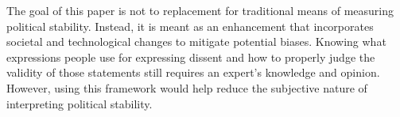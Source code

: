 \documentclass[12pt]{article}
\begin{document}
\begin{spacing}{1.5}
The goal of this paper is not to replacement for traditional means of measuring political stability. Instead, it is meant as an enhancement that incorporates societal and technological changes to mitigate potential biases. Knowing what expressions people use for expressing dissent and how to properly judge the validity of those statements still requires an expert's knowledge and opinion. However, using this framework would help reduce the subjective nature of interpreting political stability. 


\end{spacing}

\pagebreak




\nocite{*}
\end{document}
